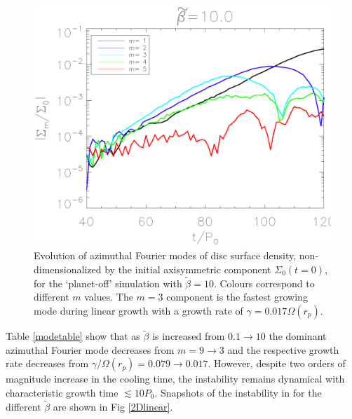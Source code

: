 \begin{figure}
  \includegraphics[width=\linewidth,clip=true,trim=1.2cm
  0cm 0cm 0cm]{figures/linear_stability}
  \caption{Evolution of azimuthal Fourier modes of disc surface
    density, non-dimensionalized by the initial axisymmetric component 
    $\Sigma_0(t=0)$, for the
    `planet-off' simulation with $\tilde{\beta}=10$. Colours correspond
    to different $m$ values. The $m=3$ component is the fastest growing
    mode during linear growth with a growth rate of 
    $\gamma=0.017\Omega(r_p)$.\label{linearmodes}}
\end{figure}


Table \ref{modetable} show that as
$\tilde{\beta}$ is increased from $ 0.1\rightarrow10$ the dominant
azimuthal Fourier mode decreases from $ m=9\rightarrow3$ and the
respective growth rate decreases from $ \gamma/\Omega(r_p)=0.079
\rightarrow 0.017$. However, despite two orders of magnitude increase in the
cooling time, the instability remains dynamical with characteristic  growth time
$\lesssim 10P_0$. Snapshots of the instability in for  
the different $\tilde\beta$ are shown in Fig \ref{2Dlinear}. 


